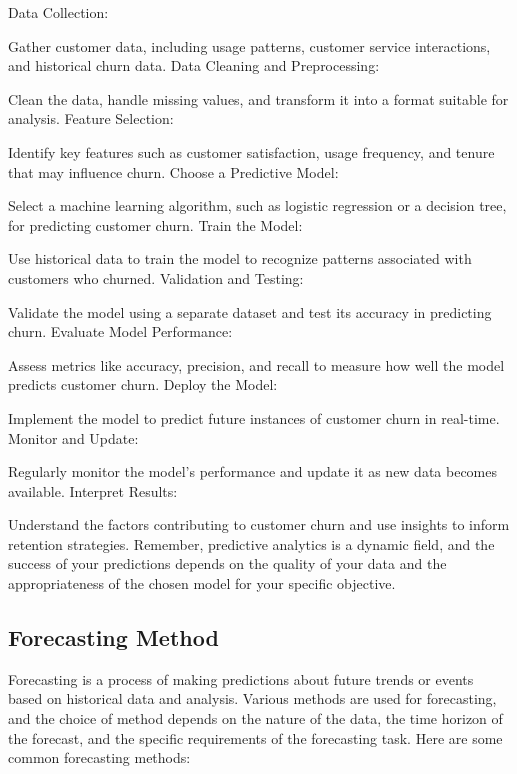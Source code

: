 Data Collection:

Gather customer data, including usage patterns, customer service interactions, and historical churn data.
Data Cleaning and Preprocessing:

Clean the data, handle missing values, and transform it into a format suitable for analysis.
Feature Selection:

Identify key features such as customer satisfaction, usage frequency, and tenure that may influence churn.
Choose a Predictive Model:

Select a machine learning algorithm, such as logistic regression or a decision tree, for predicting customer churn.
Train the Model:

Use historical data to train the model to recognize patterns associated with customers who churned.
Validation and Testing:

Validate the model using a separate dataset and test its accuracy in predicting churn.
Evaluate Model Performance:

Assess metrics like accuracy, precision, and recall to measure how well the model predicts customer churn.
Deploy the Model:

Implement the model to predict future instances of customer churn in real-time.
Monitor and Update:

Regularly monitor the model's performance and update it as new data becomes available.
Interpret Results:

Understand the factors contributing to customer churn and use insights to inform retention strategies.
Remember, predictive analytics is a dynamic field, and the success of your predictions depends on the quality of your data and the appropriateness of the chosen model for your specific objective.

%
\subsection{Forecasting Method}
\label{relatedknowledge:Demand Prediction:Forecasting Method}
%
Forecasting is a process of making predictions about future trends or events based on historical data and analysis. Various methods are used for forecasting, and the choice of method depends on the nature of the data, the time horizon of the forecast, and the specific requirements of the forecasting task. Here are some common forecasting methods:

